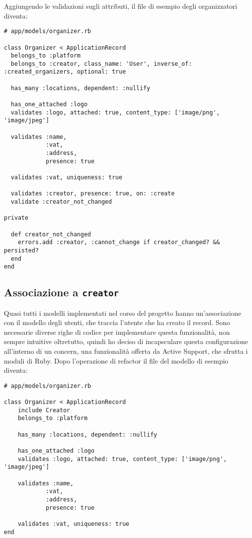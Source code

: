 Aggiungendo le validazioni sugli attributi, il file di esempio degli organizzatori diventa:
\begin{verbatim}
# app/models/organizer.rb

class Organizer < ApplicationRecord
  belongs_to :platform
  belongs_to :creator, class_name: 'User', inverse_of: :created_organizers, optional: true

  has_many :locations, dependent: :nullify

  has_one_attached :logo
  validates :logo, attached: true, content_type: ['image/png', 'image/jpeg']

  validates :name,
            :vat,
            :address,
            presence: true

  validates :vat, uniqueness: true

  validates :creator, presence: true, on: :create
  validate :creator_not_changed

private

  def creator_not_changed
    errors.add :creator, :cannot_change if creator_changed? && persisted?
  end
end
\end{verbatim}

\subsection{Associazione a \texttt{creator}}
Quasi tutti i modelli implementati nel corso del progetto hanno un'associazione con il modello degli utenti, che traccia l'utente che ha creato il record. Sono necessarie diverse righe di codice per implementare questa funzionalità, non sempre intuitive oltretutto, quindi ho deciso di incapsculare questa configurazione all'interno di un concern, una funzionalità offerta da Active Support, che sfrutta i moduli di Ruby. Dopo l'operazione di refactor il file del modello di esempio diventa:
\begin{verbatim}
# app/models/organizer.rb

class Organizer < ApplicationRecord
	include Creator
	belongs_to :platform

	has_many :locations, dependent: :nullify

	has_one_attached :logo
	validates :logo, attached: true, content_type: ['image/png', 'image/jpeg']

	validates :name,
			:vat,
			:address,
			presence: true

	validates :vat, uniqueness: true
end
\end{verbatim}

